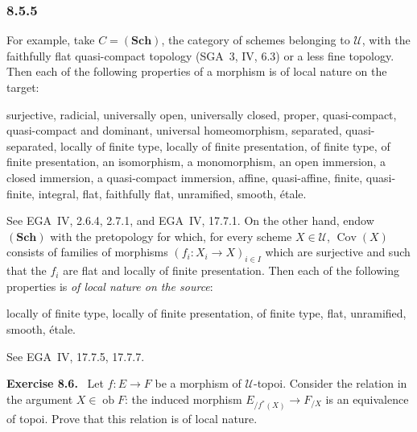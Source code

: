 \documentclass[11pt]{article}
\newcommand{\U}{\mathcal{U}}
\newcommand{\Sch}{\mathbf{Sch}}
\newcommand{\Cov}{\operatorname{Cov}}
\newcommand{\ob}{\operatorname{ob}}
\newcommand{\EGA}{EGA}
\newcommand{\SGA}{SGA}
\newenvironment{remarktext}[1]{\par\medskip\noindent\textbf{#1.}\ }{\par\medskip}
\begin{document}
\subsubsection*{8.5.5}
For example, take \(C=(\Sch)\), the category of schemes belonging to \(\U\), with the faithfully flat quasi-compact topology (\SGA~3, IV, 6.3) or a less fine topology. Then each of the following properties of a morphism is of local nature on the target:
\begin{center}
\begin{minipage}{0.93\linewidth}
surjective, radicial, universally open, universally closed, proper, quasi-compact, quasi-compact and dominant, universal homeomorphism, separated, quasi-separated, locally of finite type, locally of finite presentation, of finite type, of finite presentation, an isomorphism, a monomorphism, an open immersion, a closed immersion, a quasi-compact immersion, affine, quasi-affine, finite, quasi-finite, integral, flat, faithfully flat, unramified, smooth, \'{e}tale.
\end{minipage}
\end{center}
See \EGA~IV, 2.6.4, 2.7.1, and \EGA~IV, 17.7.1. On the other hand, endow \((\Sch)\) with the pretopology for which, for every scheme \(X\in\U\), \(\Cov(X)\) consists of families of morphisms \((f_i:X_i\to X)_{i\in I}\) which are surjective and such that the \(f_i\) are flat and locally of finite presentation. Then each of the following properties is \emph{of local nature on the source}:
\begin{center}
locally of finite type, locally of finite presentation, of finite type, flat, unramified, smooth, \'{e}tale.
\end{center}
See \EGA~IV, 17.7.5, 17.7.7.

\begin{remarktext}{Exercise 8.6}
Let \(f:E\to F\) be a morphism of \(\U\)-topoi. Consider the relation in the argument \(X\in\ob F\): the induced morphism \(E_{/f^*(X)}\to F_{/X}\) is an equivalence of topoi. Prove that this relation is of local nature.
\end{remarktext}
\end{document}

